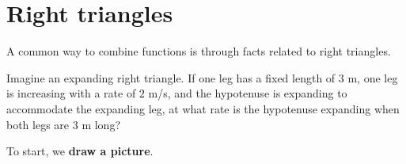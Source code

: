 \documentclass{ximera}
\begin{document}



\section{Right triangles}

A common way to combine functions is through facts related to right
triangles.


\begin{example}
  Imagine an expanding right triangle. If one leg has a fixed length
  of $3$ m, one leg is increasing with a rate of $2$ m/s, and the
  hypotenuse is expanding to accommodate the expanding leg, at what
  rate is the hypotenuse expanding when both legs are $3$ m long?
  \begin{explanation}
    To start, we \textbf{draw a picture}.
    \begin{image}
    \end{image}


\end{explanation}
\end{example}
\end{document}
